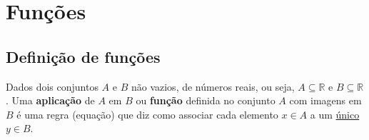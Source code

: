 
\chapter{Funções}

\section{Definição de funções}

\vskip0.3cm
 \colorbox{azul}{
 \begin{minipage}{0.9\linewidth}
 \begin{center}
  Dados dois conjuntos $A$ e $B$ não vazios, de números reais, ou seja, $A \subseteq \mathbb{R}$ e $B \subseteq \mathbb{R}$. Uma \textbf{aplicação} de $A$ em $B$ ou \textbf{função} definida no conjunto $A$ com imagens em $B$ é uma regra (equação) que diz como associar cada elemento $x \in A$ a um \underline{único} $y \in B$.
 \end{center}
 \end{minipage}}
 \vskip0.3cm


